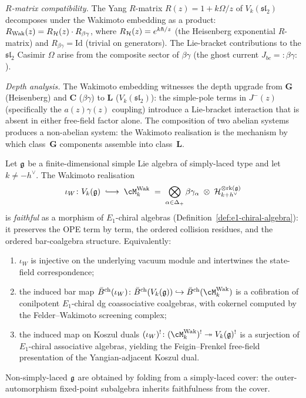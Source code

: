 \begin{computation}
\smallskip
\noindent
\emph{$R$-matrix compatibility.}
The Yang $R$-matrix
$R(z) = 1 + k\Omega/z$ of $V_k(\mathfrak{sl}_2)$
decomposes under the Wakimoto embedding as a product:
$R_{\mathrm{Wak}}(z) = R_{\mathcal{H}}(z) \cdot R_{\beta\gamma}$,
where $R_{\mathcal{H}}(z) = e^{k\hbar/z}$ (the Heisenberg
exponential $R$-matrix) and
$R_{\beta\gamma} = \mathrm{Id}$ (trivial on generators).
The Lie-bracket contributions to the $\mathfrak{sl}_2$
Casimir $\Omega$ arise from the composite sector of
$\beta\gamma$ (the ghost current $J_{bc} = {:}\beta\gamma{:}$).

\smallskip
\noindent
\emph{Depth analysis.}
The Wakimoto embedding witnesses the depth upgrade from
$\mathbf{G}$ (Heisenberg) and $\mathbf{C}$ ($\beta\gamma$)
to $\mathbf{L}$ ($V_k(\mathfrak{sl}_2)$): the simple-pole
terms in $J^-(z)$ (specifically the $a(z)\gamma(z)$ coupling)
introduce a Lie-bracket interaction that is absent in either
free-field factor alone. The composition of two abelian
systems produces a non-abelian system: the Wakimoto realisation
is the mechanism by which class~$\mathbf{G}$ components
assemble into class~$\mathbf{L}$.
\end{computation}

\begin{proposition}%
\label{prop:wakimoto-faithful-chiral}%
%
%
%
Let $\mathfrak{g}$ be a finite-dimensional simple Lie algebra of
simply-laced type and let $k \neq -h^\vee$. The Wakimoto
realisation
\[
 \iota_W \colon V_k(\fg) \;\lhook\joinrel\longrightarrow\;
 \cM_k^{\mathrm{Wak}}
 \;=\; \bigotimes_{\alpha \in \Delta_+}
 \beta\gamma_\alpha
 \;\otimes\; \cH_{k+h^\vee}^{\otimes \mathrm{rk}(\fg)}
\]
is \emph{faithful} as a morphism of $E_1$-chiral algebras
(Definition~\ref{def:e1-chiral-algebra}): it preserves the
OPE term by term, the ordered collision residues, and the
ordered bar-coalgebra structure. Equivalently:
\begin{enumerate}[label=\textup{(\roman*)}]
\item $\iota_W$ is injective on the underlying vacuum module
and intertwines the state-field correspondence;
\item the induced bar map
$\barBch(\iota_W) \colon \barBch(V_k(\fg))
\hookrightarrow \barBch(\cM_k^{\mathrm{Wak}})$
is a cofibration of conilpotent $E_1$-chiral dg coassociative
coalgebras, with cokernel computed by the Felder--Wakimoto
screening complex;
\item the induced map on Koszul duals
$(\iota_W)^! \colon (\cM_k^{\mathrm{Wak}})^!
\twoheadrightarrow V_k(\fg)^!$
is a surjection of $E_1$-chiral associative algebras,
yielding the Feigin--Frenkel free-field presentation of
the Yangian-adjacent Koszul dual.
\end{enumerate}
Non-simply-laced $\mathfrak{g}$ are obtained by folding from a
simply-laced cover: the outer-automorphism fixed-point
subalgebra inherits faithfulness from the cover.
\end{proposition}

